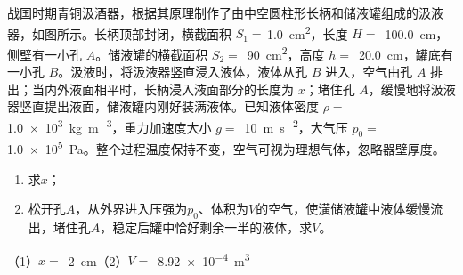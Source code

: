 战国时期青铜汲酒器，根据其原理制作了由中空圆柱形长柄和储液罐组成的汲液器，如图所示。长柄顶部封闭，横截面积 \( S_1 = \)\,\qty{1.0}{cm^2}，长度 \( H =  \) \,\qty{100.0}{cm}，侧壁有一小孔 \(A\)。储液罐的横截面积 \( S_2 = \) \,\qty{90}{cm^2}，高度 \( h =  \) \,\qty{20.0}{cm}，罐底有一小孔 \(B\)。汲液时，将汲液器竖直浸入液体，液体从孔 \(B\) 进入，空气由孔 \(A\) 排出；当内外液面相平时，长柄浸入液面部分的长度为 \( x \)；堵住孔 \(A\)，缓慢地将汲液器竖直提出液面，储液罐内刚好装满液体。已知液体密度 \( \rho =  \) \,\qty{1.0e3}{kg\per m^3}，重力加速度大小 \( g =  \) \,\qty{10}{m\per s^2}，大气压 \( p_0 = \) \,\qty{1.0e5}{Pa}。整个过程温度保持不变，空气可视为理想气体，忽略器壁厚度。

\begin{enumerate}
    \item 求\(x\)；
    \item 松开孔\(A\)，从外界进入压强为\(p_0\)、体积为\(V\)的空气，使潢储液罐中液体缓慢流出，堵住孔\(A\)，稳定后罐中恰好剩余一半的液体，求\(V\)。
\end{enumerate}

\begin{answer}
    （1）\(x =\) \,\qty{2}{cm}（2）\(V =\)\, \qty{8.92e-4}{m^3}
\end{answer}